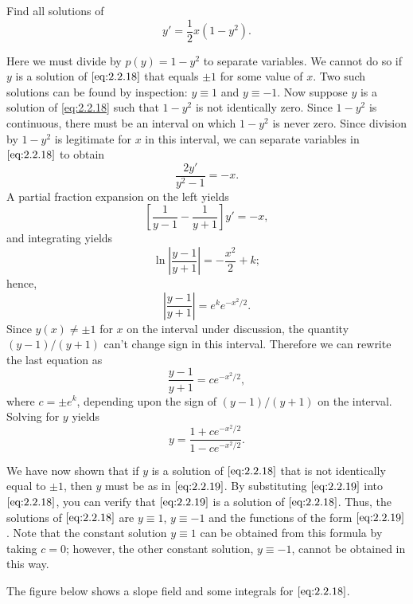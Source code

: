 \documentclass{ximera}
\begin{document}
\begin{example}\label{example:2.2.5}
Find all solutions of
\begin{equation} \label{eq:2.2.18}
y'=\frac{1}{2}x(1-y^2).
\end{equation}
 
\begin{explanation}
 
Here we must divide by $p(y)=1-y^2$ to separate variables.
We cannot do so if $y$ is a solution of $\eqref{eq:2.2.18}$ that
equals $\pm 1$ for some value of $x$. Two such solutions can be found
by inspection: $y \equiv 1$ and $y\equiv -1$. Now suppose
$y$ is a solution of \eqref{eq:2.2.18} such that $1-y^2$ is not identically zero. Since $1-y^2$ is continuous, there must be an
interval on which $1-y^2$ is never zero. Since division by $1-y^2$ is
legitimate for $x$ in this interval, we can separate variables in
$\eqref{eq:2.2.18}$ to obtain
$$
\frac{2y'}{y^2-1}=-x.
$$
 A partial fraction expansion on the left yields
$$
\left[\frac{1}{y-1}-\frac{1}{y+1}\right]y'=-x,
$$
and integrating yields
$$
\ln\left|\frac{y-1}{y+1}\right|=-\frac{x^2}{2}+k;
$$
 hence,
$$
\left|\frac{y-1}{y+1}\right|=e^ke^{-x^2/2}.
$$
 Since $y(x)\neq \pm 1$ for $x$ on the interval under discussion, the
quantity
$(y-1)/(y+1)$  can't  change sign in this interval. Therefore
we can rewrite the last equation as
$$
\frac{y-1}{y+1}=ce^{-x^2/2},
$$
  where $c=\pm e^k$, depending upon the sign of $(y-1)/(y+1)$ on the
interval.
 Solving for  $y$ yields
\begin{equation} \label{eq:2.2.19}
y=\frac{1+ce^{-x^2/2}}{1-ce^{-x^2/2}}.
\end{equation}
 
We have now shown that if $y$ is a solution of $\eqref{eq:2.2.18}$ that  is not identically equal to $\pm 1$, then $y$ must be as in
$\eqref{eq:2.2.19}$. By substituting $\eqref{eq:2.2.19}$ into $\eqref{eq:2.2.18}$, you
 can verify that $\eqref{eq:2.2.19}$ is a solution of
$\eqref{eq:2.2.18}$. Thus,  the solutions of $\eqref{eq:2.2.18}$
are $y\equiv 1$, $y\equiv -1$ and the functions of the form
$\eqref{eq:2.2.19}$. Note that the constant solution $y \equiv 1$ can be
obtained from this formula by taking $c=0$; however, the other
constant solution, $y \equiv -1$, cannot be obtained in this way.
 
The figure below shows a slope field and some integrals for
$\eqref{eq:2.2.18}$.
 
 

\begin{center}
\end{center}
\end{explanation}
\end{example}
 
\end{document}
